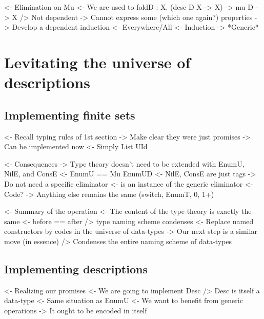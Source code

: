 \documentclass{article}
\newenvironment{structure}{\footnotesize\verbatim}{\endverbatim}
\begin{document}
\begin{structure}
<- Elimination on Mu
    <- We are used to foldD : \forall X. (desc D X -> X) -> mu D -> X
        /> Not dependent
        -> Cannot express some (which one again?) properties
    -> Develop a dependent induction
        <- Everywhere/All
        <- Induction
    -> *Generic*
\end{structure}

\section{Levitating the universe of descriptions}

\subsection{Implementing finite sets}

\begin{structure}
<- Recall typing rules of 1st section
    -> Make clear they were just promises
    -> Can be implemented now
        <- Simply List UId
\end{structure}

\begin{structure}
<- Consequences
    -> Type theory doesn't need to be extended with EnumU, NilE, and ConsE
        <- EnumU == Mu EnumUD
        <- NilE, ConsE are just tags
    -> Do not need a specific \spi eliminator
        <- \spi is an instance of the generic eliminator
            <- Code?
    -> Anything else remains the same (switch, EnumT, 0, 1+)
\end{structure}

\begin{structure}
<- Summary of the operation
    <- The content of the type theory is exactly the same
        <- before == after
    /> type naming scheme condenses
        <- Replace named constructors by codes in the universe of data-types
    -> Our next step is a similar move (in essence)
        /> Condenses the entire naming scheme of data-types
\end{structure}

\subsection{Implementing descriptions}

\begin{structure}
<- Realizing our promises
    <- We are going to implement Desc
    /> Desc is itself a data-type
        <- Same situation as EnumU
            <- We want to benefit from generic operations
        -> It ought to be encoded in itself
\end{structure}
\end{document}
